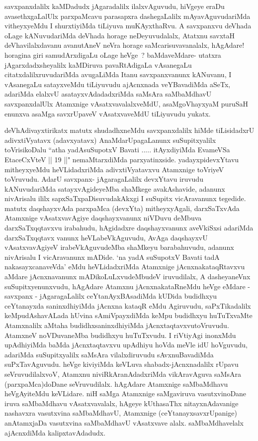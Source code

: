 \begin{artha}
savxpanxdalilx kaMDadudx jAgaradalilx ilalxvAguvudu, hiVgeye eraDu
avasethxgaLalUlx parxpaMcavu parasapxra dashegaLalilx
mAyavAguvudariMda vitheyxyeMdu I shurxtiyiMda tiLiyuva muKAyxthaRvu.
A savxpanxvu deVhada oLage kANuvudariMda deVhada horage
neDeyuvudalalx, Atatxnu savxtaH deVhavilalxdavanu avanutAneV neVra
horage saMcarisuvavanalalx, hAgAdare! horagina giri samudArxdigaLu
oLage heVge~? baMdaveMdare- utatxra jAgarxdadxsheyalilx kaMDiruva
pavaRtAdigaLa vAsanegaLu citatxdalilxruvudariMda avugaLiMda Itanu
savxpanxvanunx kANuvanu, I vAsanegaLu satayxveMdu tiLiyuvudu
ajAcnxnada veYBavadiMda aSeTx, adariMda elalxvU asatayxvAdadadxriMda
saMsAra saMbaMdhavU savxpanxdalUlx Atamxnige vAsatxvavalalxveMdU,
 asaMgoVhayxyaM puruSaH enunxva asaMga savxrUpaveV vAsatxvaveMdU
tiLiyuvudu yukatx.
\end{artha}

\centerline{}

\begin{artha}
deVhAdivayxtirikatx matutx shudadhxneMdu savxpanxdalilx hiMde
tiLisidadxrU adivxtiVyatavx (adavxyatavx) AnaMdarUpagaLanunx
suSupitxyalilx toVrisikoDalu ``atha yadAsuSupotxV Bavati ..... itAyxdiyiMda EvameVSa EtaceCxVteV  || 19 ||" nemaMtarxdiMda parxyatinxside. yadayxpidevxYtavu mitheyxyeMdu heVLidadxriMda
adivxtiVyatavxvu Atamxnige toVriyeV toVruvudu. AdarU savxpanx-
jAgaragaLalilx devxYtavu iruvudu kANuvudariMda satayxvAgideyeMba
shaMkege avakAshavide, adanunx nivArisalu ililx
sapxSaTxpaDisuvudakAkxgi I suSupitx vicAravanunx tegedide. matutx
daqshayxvAda parxpaMca  (devxYta) mitheyxyAgali, darxSaTxvAda Atamxnige
vAsatxvavAgiye daqshayxvanunx niVDuvu deMbuva darxSaTxqqtavxvu
irabahudu, hAgidadxre daqshayxvanunx aveVkiSxsi adariMda
darxSaTxqqtavx	vanunx heVLabeVkAguvudu, AvAga daqshayxvU
vAsatxvavAgiyeV irabeVkAguvudeMba shaMkeyu barabahuvudu, adanunx
nivArisalu I vicAravanunx mADide. `na yadA suSupotxV Bavati tadA nakasayxcanaveVda' eMdu heVLidadxriMda Atamxnige
jAcnxnakataqRtavxvu aMdare jAcnxnavanunx mADikoLuLxvudeMbudeV
iruvudilalx, A dasheyaneVnx suSupitxyenunxvudu, hAgAdare Atamxnu
jAcnxnakataRneMdu heVge eMdare - savxpanx - jAgaragaLalilx
ceYtanAyxBAsadiMda kUDida budidhxyu ceYtanayxda saninxdhiyiMda jAcnxna
kataqR eMdu Agiruvudu, saPxTikadalilx keMpudAshavALada hUvina
sAmiVpayxdiMda keMpu budidhxyu huTuTxvaMte Atamxnalilx aMtaha
budidhxsaninxdhiyiMda jAcnxtaqtavxvutoVruvudu. AtamxneV noVDuvaneMba
budidhxyu huTuTxvudu. I riVtiyAgi inonxMdu upAdhiyiMda baMda
jAcnxtaqtavxvu upAdhiyu hoVda meVle idU hoVguvudu, adariMda
suSupitxyalilx saMsAra vilalxdiruvudu sAvxnuBavadiMda
suPxTavAguvudu. heVge kiviyiMda keVLuva shabadx-jAcnxnadalilx rUpavu
seVruvudilalxvoV, Atamxnu niviRkAranAdadxriMda vikAravAguva saMsAra
(parxpaMca)doDane seVruvudilalx. hAgAdare Atamxnige saMbaMdhavu
heVgAyiteMdu keVLidare. niH saMga Atamxnige saMgaviruva
vasutxvinoDane iruva saMbaMdhavu vAsatxvavalalx, hAgeye kUthasaThx
nitayxnAdavanige nashavxra vasutxvina saMbaMdhavU, Atamxnige
(ceYtanayxsavxrUpanige) anAtamxjaDa vasutxvina saMbaMdhavU
vAsatxvave alalx. saMbaMdhavelalx ajAcnxdiMda kalipxtavAdadudx.
\end{artha}


